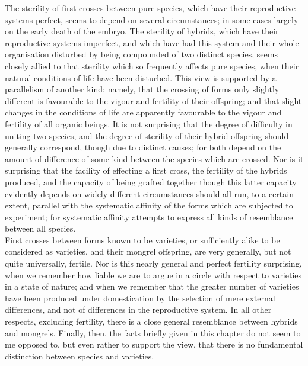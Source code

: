 \indent The sterility of first crosses between pure species, which have their reproductive systems perfect, seems to depend on several circumstances; in some cases largely on the early death of the embryo. The sterility of hybrids, which have their reproductive systems imperfect, and which have had this system and their whole organisation disturbed by being compounded of two distinct species, seems closely allied to that sterility which so frequently affects pure species, when their natural conditions of life have been disturbed. This view is supported by a parallelism of another kind; namely, that the crossing of forms only slightly different is favourable to the vigour and fertility of their offspring; and that slight changes in the conditions of life are apparently favourable to the vigour and fertility of all organic beings. It is not surprising that the degree of difficulty in uniting two species, and the degree of sterility of their hybrid-offspring should generally correspond, though due to distinct causes; for both depend on the amount of difference of some kind between the species which are crossed. Nor is it surprising that the facility of effecting a first cross, the fertility of the hybrids produced, and the capacity of being grafted together though this latter capacity evidently depends on widely different circumstances should all run, to a certain extent, parallel with the systematic affinity of the forms which are subjected to experiment; for systematic affinity attempts to express all kinds of resemblance between all species.\\
\indent First crosses between forms known to be varieties, or sufficiently alike to be considered as varieties, and their mongrel offspring, are very generally, but not quite universally, fertile. Nor is this nearly general and perfect fertility surprising, when we remember how liable we are to argue in a circle with respect to varieties in a state of nature; and when we remember that the greater number of varieties have been produced under domestication by the selection of mere external differences, and not of differences in the reproductive system. In all other respects, excluding fertility, there is a close general resemblance between hybrids and mongrels. Finally, then, the facts briefly given in this chapter do not seem to me opposed to, but even rather to support the view, that there is no fundamental distinction between species and varieties.\\